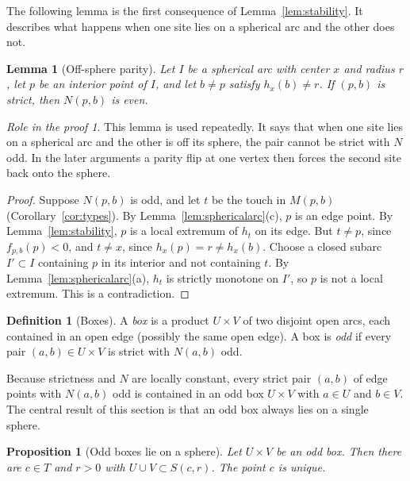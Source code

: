 \documentclass[11pt]{amsart}
\newtheorem{lemma}[theorem]{Lemma}
\newtheorem{proposition}[theorem]{Proposition}
\theoremstyle{definition}
\newtheorem{definition}[theorem]{Definition}
\theoremstyle{remark}
\newtheorem*{role}{Role in the proof}
\newcommand{\M}{M}
\newcommand{\N}{N}
\begin{document}
The following lemma is the first consequence of Lemma~\ref{lem:stability}. It describes what happens when one site lies on a spherical arc and the other does not.

\begin{lemma}[Off-sphere parity]\label{lem:offsphere}
Let $I$ be a spherical arc with center $x$ and radius $r$, let $p$ be an interior point of $I$, and let $b\ne p$ satisfy $h_x(b)\ne r$. If $(p,b)$ is strict, then $\N(p,b)$ is even.
\end{lemma}

\begin{role}
This lemma is used repeatedly. It says that when one site lies on a spherical arc and the other is off its sphere, the pair cannot be strict with $\N$ odd. In the later arguments a parity flip at one vertex then forces the second site back onto the sphere.
\end{role}

\begin{proof}
Suppose $\N(p,b)$ is odd, and let $t$ be the touch in $\M(p,b)$ (Corollary~\ref{cor:types}). By Lemma~\ref{lem:sphericalarc}(c), $p$ is an edge point. By Lemma~\ref{lem:stability}, $p$ is a local extremum of $h_t$ on its edge. But $t\ne p$, since $f_{p,b}(p)<0$, and $t\ne x$, since $h_x(p)=r\ne h_x(b)$. Choose a closed subarc $I'\subset I$ containing $p$ in its interior and not containing $t$. By Lemma~\ref{lem:sphericalarc}(a), $h_t$ is strictly monotone on $I'$, so $p$ is not a local extremum. This is a contradiction.
\end{proof}

\begin{definition}[Boxes]\label{def:box}
A \emph{box} is a product $U\times V$ of two disjoint open arcs, each contained in an open edge (possibly the same open edge). A box is \emph{odd} if every pair $(a,b)\in U\times V$ is strict with $\N(a,b)$ odd.
\end{definition}

\noindent
Because strictness and $\N$ are locally constant, every strict pair $(a,b)$ of edge points with $\N(a,b)$ odd is contained in an odd box $U\times V$ with $a\in U$ and $b\in V$. The central result of this section is that an odd box always lies on a single sphere.

\begin{proposition}[Odd boxes lie on a sphere]\label{prop:oddbox}
Let $U\times V$ be an odd box. Then there are $c\in T$ and $r>0$ with $U\cup V\subset S(c,r)$. The point $c$ is unique.
\end{proposition}
\end{document}
